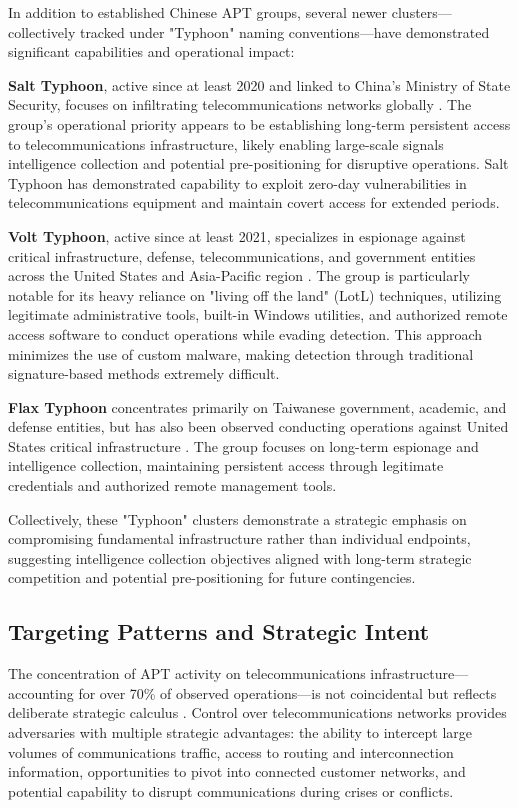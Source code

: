 In addition to established Chinese APT groups, several newer clusters—collectively tracked under "Typhoon" naming conventions—have demonstrated significant capabilities and operational impact:

\textbf{Salt Typhoon}, active since at least 2020 and linked to China's Ministry of State Security, focuses on infiltrating telecommunications networks globally \cite{socradar2024}. The group's operational priority appears to be establishing long-term persistent access to telecommunications infrastructure, likely enabling large-scale signals intelligence collection and potential pre-positioning for disruptive operations. Salt Typhoon has demonstrated capability to exploit zero-day vulnerabilities in telecommunications equipment and maintain covert access for extended periods.

\textbf{Volt Typhoon}, active since at least 2021, specializes in espionage against critical infrastructure, defense, telecommunications, and government entities across the United States and Asia-Pacific region \cite{socradar2024}. The group is particularly notable for its heavy reliance on "living off the land" (LotL) techniques, utilizing legitimate administrative tools, built-in Windows utilities, and authorized remote access software to conduct operations while evading detection. This approach minimizes the use of custom malware, making detection through traditional signature-based methods extremely difficult.

\textbf{Flax Typhoon} concentrates primarily on Taiwanese government, academic, and defense entities, but has also been observed conducting operations against United States critical infrastructure \cite{socradar2024}. The group focuses on long-term espionage and intelligence collection, maintaining persistent access through legitimate credentials and authorized remote management tools.

Collectively, these "Typhoon" clusters demonstrate a strategic emphasis on compromising fundamental infrastructure rather than individual endpoints, suggesting intelligence collection objectives aligned with long-term strategic competition and potential pre-positioning for future contingencies.

\subsection{Targeting Patterns and Strategic Intent}

The concentration of APT activity on telecommunications infrastructure—accounting for over 70\% of observed operations—is not coincidental but reflects deliberate strategic calculus \cite{trellix2025}. Control over telecommunications networks provides adversaries with multiple strategic advantages: the ability to intercept large volumes of communications traffic, access to routing and interconnection information, opportunities to pivot into connected customer networks, and potential capability to disrupt communications during crises or conflicts.

